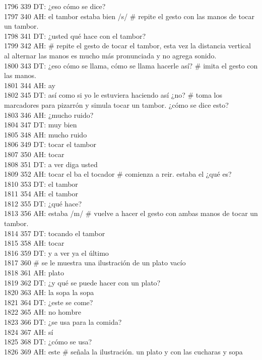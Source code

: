 1796 339 DT: ¿eso cómo se dice?\\
1797 340 AH: el tambor estaba bien /s/ # repite el gesto con las manos de tocar un tambor.\\
1798 341 DT: ¿usted qué hace con el tambor?\\
1799 342 AH: # repite el gesto de tocar el tambor, esta vez la distancia vertical al alternar las manos es mucho más pronunciada y no agrega sonido.\\
1800 343 DT: ¿eso cómo se llama, cómo se llama hacerle así? # imita el gesto con las manos.\\
1801 344 AH: ay\\
1802 345 DT: así como si yo le estuviera haciendo así ¿no? # toma los marcadores para pizarrón y simula tocar un tambor. ¿cómo se dice esto?\\
1803 346 AH: ¿mucho ruido?\\
1804 347 DT: muy bien\\
1805 348 AH: mucho ruido\\
1806 349 DT: tocar el tambor\\
1807 350 AH: tocar\\
1808 351 DT: a ver diga usted\\
1809 352 AH: tocar el ba el tocador # comienza a reir. estaba el ¿qué es?\\
1810 353 DT: el tambor\\
1811 354 AH: el tambor\\
1812 355 DT: ¿qué hace?\\
1813 356 AH: estaba /m/ # vuelve a hacer el gesto con ambas manos de tocar un tambor.\\
1814 357 DT: tocando el tambor\\
1815 358 AH: tocar\\
1816 359 DT: y a ver ya el último\\
1817 360 # se le muestra una ilustración de un plato vacío\\
1818 361 AH: plato\\
1819 362 DT: ¿y qué se puede hacer con un plato?\\
1820 363 AH: la sopa la sopa\\
1821 364 DT: ¿este se come?\\
1822 365 AH: no hombre\\
1823 366 DT: ¿se usa para la comida?\\
1824 367 AH: sí\\
1825 368 DT: ¿cómo se usa?\\
1826 369 AH: este # señala la ilustración. un plato y con las cucharas y sopa\\
